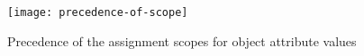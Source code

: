  
 	\begin{figure}[t]
 		\centering
 		\texttt{[image: precedence-of-scope]}
 		\caption{Precedence of the assignment scopes for object attribute values}
 		\label{fig:precedence-of-scope}
 	\end{figure}
 